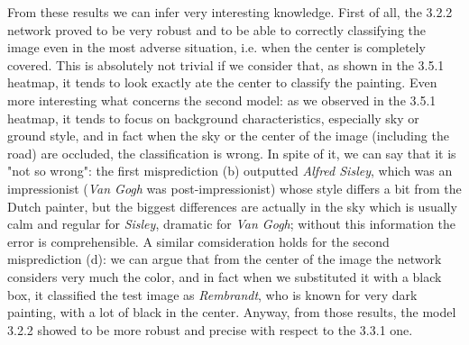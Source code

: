 \medskip

\noindent From these results we can infer very interesting knowledge. First of all, the 3.2.2 network proved to be very robust and to be able to correctly classifying the image even in the most adverse situation, i.e. when the center is completely covered. This is absolutely not trivial if we consider that, as shown in the 3.5.1 heatmap, it tends to look exactly ate the center to classify the painting. Even more interesting what concerns the second model: as we observed in the 3.5.1 heatmap, it tends to focus on background characteristics, especially sky or ground style, and in fact when the sky or the center of the image (including the road) are occluded, the classification is wrong. In spite of it, we can say that it is "not so wrong": the first misprediction (b) outputted \textit{Alfred Sisley}, which was an impressionist (\textit{Van Gogh} was post-impressionist) whose style differs a bit from the Dutch painter, but the biggest differences are actually in the sky which is usually calm and regular for \textit{Sisley}, dramatic for \textit{Van Gogh}; without this information the error is comprehensible. A similar comsideration holds for the second misprediction (d): we can argue that from the center of the image the network considers very much the color, and in fact when we substituted it with a black box, it classified the test image as \textit{Rembrandt}, who is known for very dark painting, with a lot of black in the center.
Anyway, from those results, the model 3.2.2 showed to be more robust and precise with respect to the 3.3.1 one. 